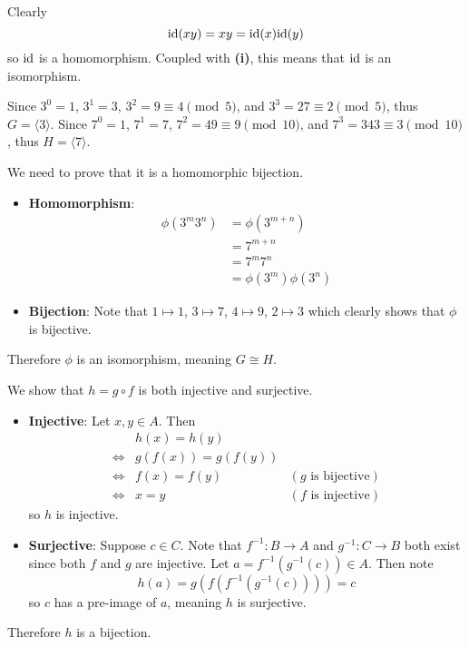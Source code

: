 \begin{questions}
\begin{partquestions}{\roman*}
        \item Clearly
        \[
            \mathrm{id}(xy) = xy = \mathrm{id}(x)\mathrm{id}(y)
        \]
        so $\mathrm{id}$ is a homomorphism. Coupled with \textbf{(i)}, this means that $\mathrm{id}$ is an isomorphism.
    \end{partquestions}

    \item \begin{partquestions}{\roman*}
        \item Since $3^0 = 1$, $3^1 = 3$, $3^2 = 9 \equiv 4 \pmod{5}$, and $3^3 = 27 \equiv 2 \pmod{5}$, thus $G = \langle 3 \rangle$. Since $7^0 = 1$, $7^1 = 7$, $7^2 = 49 \equiv 9 \pmod{10}$, and $7^3 = 343 \equiv 3 \pmod{10}$, thus $H = \langle 7 \rangle$.
        \item We need to prove that it is a homomorphic bijection.
        \begin{itemize}
            \item \textbf{Homomorphism}:
            \begin{align*}
                \phi(3^m3^n) &= \phi(3^{m+n})\\
                &= 7^{m+n}\\
                &= 7^m7^n\\
                &= \phi(3^m)\phi(3^n)
            \end{align*}

            \item \textbf{Bijection}: Note that $1 \mapsto 1$, $3 \mapsto 7$, $4 \mapsto 9$, $2 \mapsto 3$ which clearly shows that $\phi$ is bijective.
        \end{itemize}
        Therefore $\phi$ is an isomorphism, meaning $G \cong H$.
    \end{partquestions}

    \item \begin{partquestions}{\roman*}
        \item We show that $h = g\circ f$ is both injective and surjective.
        \begin{itemize}
            \item \textbf{Injective}: Let $x, y \in A$. Then
            \begin{align*}
                &h(x) = h(y)\\
                \iff&g(f(x)) = g(f(y))\\
                \iff&f(x) = f(y) & (g \text{ is bijective})\\
                \iff&x = y & (f \text{ is injective})
            \end{align*}
            so $h$ is injective.
            \item \textbf{Surjective}: Suppose $c \in C$. Note that $f^{-1}: B \to A$ and $g^{-1}: C \to B$ both exist since both $f$ and $g$ are injective. Let $a = f^{-1}(g^{-1}(c)) \in A$. Then note
            \[
                h(a) = g(f(f^{-1}(g^{-1}(c)))) = c
            \]
            so $c$ has a pre-image of $a$, meaning $h$ is surjective.
        \end{itemize}
        Therefore $h$ is a bijection.


\end{partquestions}
\end{questions}
